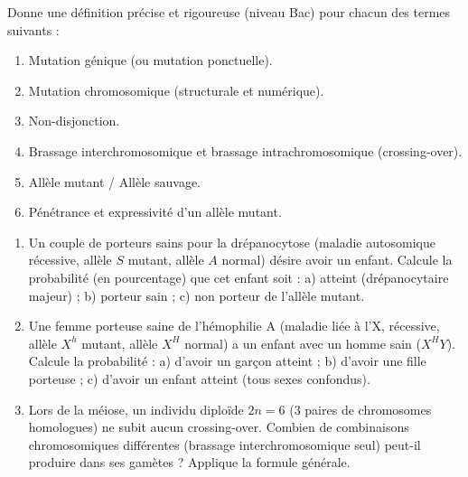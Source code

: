 \documentclass[11pt]{article}
\newcounter{popsec}
\newcounter{popsub}
\newcommand{\courssub}[1]{%
  \stepcounter{popsub}%
  \par\vspace{9pt}\noindent{\popxbold\fontsize{11.5}{13}\selectfont\color{popink}{\color{poporange}\thepopsec.\thepopsub}\hspace{6pt}#1}\par\nopagebreak\vspace{4pt}
}
\begin{document}
\begin{exercice}
Donne une définition précise et rigoureuse (niveau Bac) pour chacun des termes suivants :
\begin{enumerate}
    \item Mutation génique (ou mutation ponctuelle).
    \item Mutation chromosomique (structurale et numérique).
    \item Non-disjonction.
    \item Brassage interchromosomique et brassage intrachromosomique (crossing-over).
    \item Allèle mutant / Allèle sauvage.
    \item Pénétrance et expressivité d'un allèle mutant.
\end{enumerate}
\end{exercice}

\begin{exercice}
\begin{enumerate}
    \item Un couple de porteurs sains pour la drépanocytose (maladie autosomique récessive, allèle $S$ mutant, allèle $A$ normal) désire avoir un enfant. Calcule la probabilité (en pourcentage) que cet enfant soit : a) atteint (drépanocytaire majeur) ; b) porteur sain ; c) non porteur de l'allèle mutant.
    \item Une femme porteuse saine de l'hémophilie A (maladie liée à l'X, récessive, allèle $X^h$ mutant, allèle $X^H$ normal) a un enfant avec un homme sain ($X^H Y$). Calcule la probabilité : a) d'avoir un garçon atteint ; b) d'avoir une fille porteuse ; c) d'avoir un enfant atteint (tous sexes confondus).
    \item Lors de la méiose, un individu diploïde $2n=6$ (3 paires de chromosomes homologues) ne subit aucun crossing-over. Combien de combinaisons chromosomiques différentes (brassage interchromosomique seul) peut-il produire dans ses gamètes ? Applique la formule générale.
\end{enumerate}
\end{exercice}

\courssub{Je m'entraîne}
\end{document}
